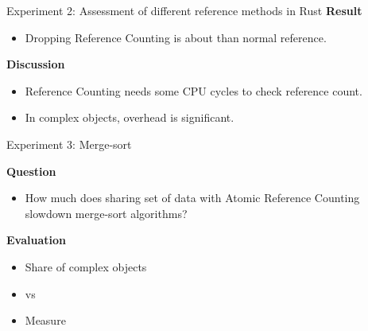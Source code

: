 \documentclass[9pt]{beamer}
\begin{document}
\begin{frame}[fragile]{Experiment 2: Assessment of different reference methods in Rust}
    \textbf{Result}
    \begin{itemize}
        \item Dropping Reference Counting is about  than normal reference.
    \end{itemize}

    \vspace{0.5cm}

    \textbf{Discussion}
    \begin{itemize}
        \item Reference Counting needs some CPU cycles to check reference count.
        \item In complex objects, overhead is significant.
    \end{itemize}
\end{frame}


\begin{frame}[fragile]{Experiment 3: Merge-sort}

    \textbf{Question}
    \begin{itemize}
        \item How much does sharing set of data with Atomic Reference Counting slowdown merge-sort algorithms?
    \end{itemize}

    \vspace{0.5cm}

    \textbf{Evaluation}
    \begin{itemize}
        \item Share  of complex objects
        \item {} vs 
        \item Measure 
    \end{itemize}

\end{frame}

\end{document}
